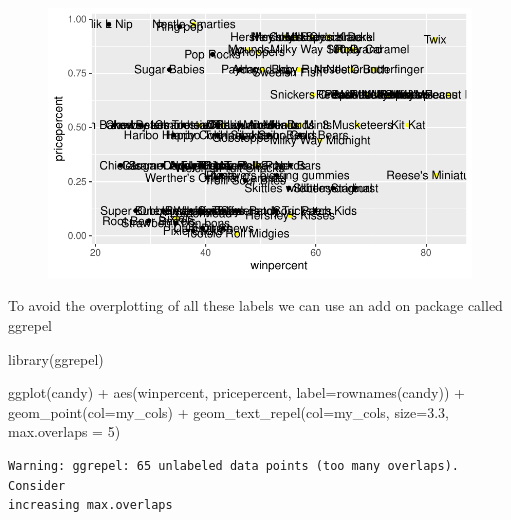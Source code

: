 \documentclass[
  letterpaper,
  DIV=11,
  numbers=noendperiod]{scrartcl}
\newenvironment{Shaded}{\begin{snugshade}}{\end{snugshade}}
\newcommand{\AttributeTok}[1]{\textcolor[rgb]{0.40,0.45,0.13}{#1}}
\newcommand{\DecValTok}[1]{\textcolor[rgb]{0.68,0.00,0.00}{#1}}
\newcommand{\FloatTok}[1]{\textcolor[rgb]{0.68,0.00,0.00}{#1}}
\newcommand{\FunctionTok}[1]{\textcolor[rgb]{0.28,0.35,0.67}{#1}}
\newcommand{\NormalTok}[1]{\textcolor[rgb]{0.00,0.23,0.31}{#1}}
\newcommand{\SpecialCharTok}[1]{\textcolor[rgb]{0.37,0.37,0.37}{#1}}
\begin{document}
\begin{figure}[H]

{\centering \includegraphics{Class-9_files/figure-pdf/unnamed-chunk-21-1.pdf}

}

\end{figure}

To avoid the overplotting of all these labels we can use an add on
package called ggrepel

\begin{Shaded}
\begin{Highlighting}[]
\FunctionTok{library}\NormalTok{(ggrepel)}
\end{Highlighting}
\end{Shaded}

\begin{Shaded}
\begin{Highlighting}[]
\FunctionTok{ggplot}\NormalTok{(candy) }\SpecialCharTok{+}
  \FunctionTok{aes}\NormalTok{(winpercent, pricepercent, }\AttributeTok{label=}\FunctionTok{rownames}\NormalTok{(candy)) }\SpecialCharTok{+}
  \FunctionTok{geom\_point}\NormalTok{(}\AttributeTok{col=}\NormalTok{my\_cols) }\SpecialCharTok{+} 
  \FunctionTok{geom\_text\_repel}\NormalTok{(}\AttributeTok{col=}\NormalTok{my\_cols, }\AttributeTok{size=}\FloatTok{3.3}\NormalTok{, }\AttributeTok{max.overlaps =} \DecValTok{5}\NormalTok{)}
\end{Highlighting}
\end{Shaded}

\begin{verbatim}
Warning: ggrepel: 65 unlabeled data points (too many overlaps). Consider
increasing max.overlaps
\end{verbatim}
\end{document}

